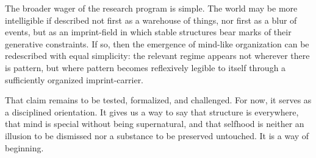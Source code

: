 \documentclass[12pt]{article}
\begin{document}
The broader wager of the research program is simple. The world may be more intelligible if described not first as a warehouse of things, nor first as a blur of events, but as an imprint-field in which stable structures bear marks of their generative constraints. If so, then the emergence of mind-like organization can be redescribed with equal simplicity: the relevant regime appears not wherever there is pattern, but where pattern becomes reflexively legible to itself through a sufficiently organized imprint-carrier.

That claim remains to be tested, formalized, and challenged. For now, it serves as a disciplined orientation. It gives us a way to say that structure is everywhere, that mind is special without being supernatural, and that selfhood is neither an illusion to be dismissed nor a substance to be preserved untouched. It is a way of beginning.
\end{document}
